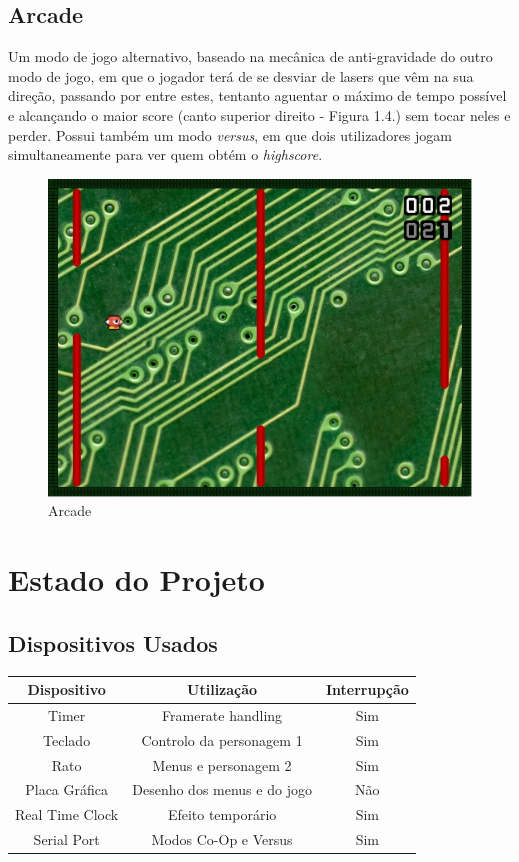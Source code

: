\documentclass{report}
\begin{document}
\section{Arcade}

Um modo de jogo alternativo, baseado na mecânica de anti-gravidade do outro modo de jogo, em que o jogador terá de se desviar de lasers que vêm na sua direção, passando por entre estes, tentanto aguentar o máximo de tempo possível e alcançando o maior score (canto superior direito - Figura 1.4.) sem tocar neles e perder.
Possui também um modo \textit{versus}, em que dois utilizadores jogam simultaneamente para ver quem obtém o \textit{highscore}.

\begin{figure}[H]
	\includegraphics[width=\textwidth]{arcade}
	\caption{Arcade}
\end{figure}

\chapter{Estado do Projeto}

\section{Dispositivos Usados}

\begin{center}
	\begin{tabular}{|c|c|c|} 
		\hline
			Dispositivo & Utilização & Interrupção \\ 
		\hline
		\hline
			Timer & Framerate handling  & Sim \\ 
			Teclado & Controlo da personagem 1 & Sim \\ 
			Rato & Menus e personagem 2 & Sim\\
			Placa Gráfica & Desenho dos menus e do jogo & Não\\
			Real Time Clock & Efeito temporário & Sim\\
			Serial Port & Modos Co-Op e Versus & Sim \\
		\hline
	\end{tabular}
\end{center}
\end{document}
